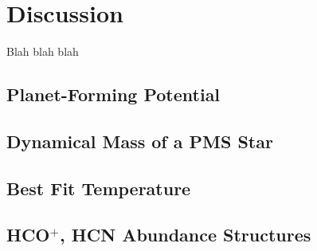 \chapter{Discussion}
\label{chap:discussion}

Blah blah blah


\section{Planet-Forming Potential}
\label{section:fitting_procedure}




\section{Dynamical Mass of a PMS Star}
\label{section:fitting_procedure}




\section{Best Fit Temperature }
\label{section:fitting_procedure}



\section{HCO$^+$, HCN Abundance Structures}
\label{section:fitting_procedure}
